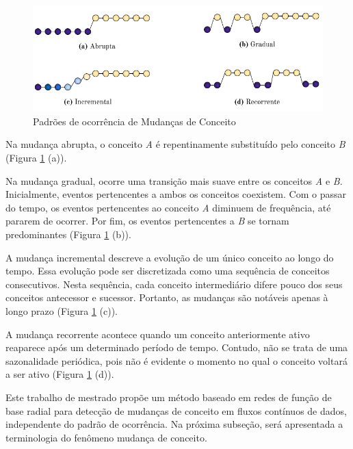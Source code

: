 \documentclass[qual, classic, a4paper]{ufbathesis}
\begin{document}
\begin{figure}[H]
\begin{center}
    \includegraphics[scale=0.8]{imagens/concept_drift_patterns.png}
    \caption{Padrões de ocorrência de Mudanças de Conceito}
    \label{fig:concept_drift_patterns}
\end{center}
\end{figure}

Na mudança abrupta, o conceito \textit{A} é repentinamente substituído pelo conceito \textit{B} (Figura \ref{fig:concept_drift_patterns} (a)).

Na mudança gradual, ocorre uma transição mais suave entre os conceitos \textit{A} e \textit{B}.
Inicialmente, eventos pertencentes a ambos os conceitos coexistem.
Com o passar do tempo, os eventos pertencentes ao conceito \textit{A} diminuem de frequência, até pararem de ocorrer.
Por fim, os eventos pertencentes a \textit{B} se tornam predominantes (Figura \ref{fig:concept_drift_patterns} (b)).

A mudança incremental descreve a evolução de um único conceito ao longo do tempo.
Essa evolução pode ser discretizada como uma sequência de conceitos consecutivos.
Nesta sequência, cada conceito intermediário difere pouco dos seus conceitos antecessor e sucessor.
Portanto, as mudanças são notáveis apenas à longo prazo (Figura \ref{fig:concept_drift_patterns} (c)).

A mudança recorrente acontece quando um conceito anteriormente ativo reaparece após um determinado período de tempo. 
Contudo, não se trata de uma sazonalidade periódica, pois não é evidente o momento no qual o conceito voltará a ser ativo (Figura \ref{fig:concept_drift_patterns} (d)).

Este trabalho de mestrado propõe um método baseado em redes de função de base radial para detecção de mudanças de conceito em fluxos contínuos de dados, independente do padrão de ocorrência.
Na próxima subseção, será apresentada a terminologia do fenômeno mudança de conceito.
\end{document}
